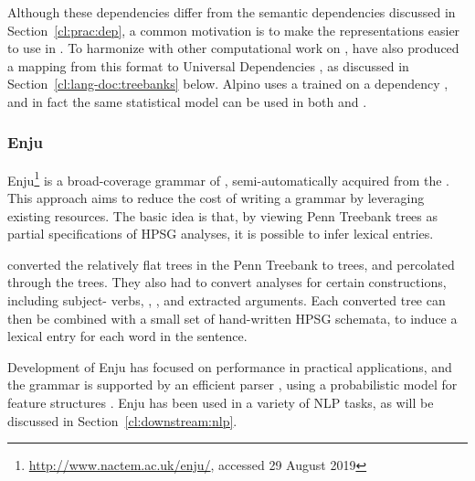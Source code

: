 \documentclass[output=paper,nonflat]{langsci/langscibook}
\begin{document}
Although these dependencies differ from the semantic dependencies discussed in Section~\ref{cl:prac:dep},
a common motivation is to make the representations easier to use in .
To harmonize with other computational work on ,
\citet{Bou:Van:17} have also produced a mapping from this format
to Universal Dependencies \citep[UD;][]{Niv:Mar:Gin:16},
as discussed in Section~\ref{cl:lang-doc:treebanks} below.
Alpino uses a  trained on a dependency ,
and in fact the same statistical model can be used in both  and  \citep{dekok2011reversible}.


\subsubsection{Enju}
\label{cl:other:enju}


Enju\footnote{%
	\url{http://www.nactem.ac.uk/enju/}, accessed 29 August 2019
} \citep{MNT2005a-u}
is a broad-coverage grammar of ,
semi-automatically acquired from the  \citep{Mar:San:Mar:93}.
This approach aims to reduce the cost of writing a grammar
by leveraging existing resources.
The basic idea is that, by viewing Penn Treebank trees as partial specifications of HPSG analyses,
it is possible to infer lexical entries.

\citeauthor{MNT2005a-u} converted the relatively flat trees in the Penn Treebank to  trees,
and percolated  through the trees.
They also had to convert analyses for certain constructions,
including subject- verbs, , , and extracted arguments.
Each converted tree can then be combined with a small set of hand-written HPSG schemata,
to induce a lexical entry for each word in the sentence.

Development of Enju has focused on performance in practical applications,
and the grammar is supported by an efficient parser \citep{tsuruoka2004enju,matsuzaki2007supertag},
using a probabilistic model for feature structures \citep{MT2008a-u}.
Enju has been used in a variety of NLP tasks, as will be discussed in Section~\ref{cl:downstream:nlp}.

\end{document}
